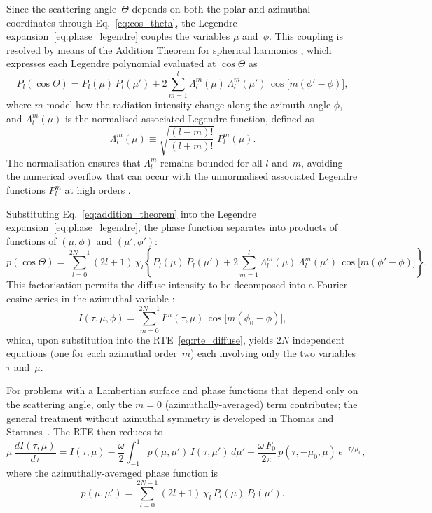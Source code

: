 \documentclass[a4paper, 11pt]{article}
\begin{document}
Since the scattering angle~$\Theta$ depends on both the polar and
azimuthal coordinates through Eq.~\eqref{eq:cos_theta}, the Legendre
expansion~\eqref{eq:phase_legendre} couples the variables $\mu$
and~$\phi$.  This coupling is resolved by means of the Addition
Theorem for spherical harmonics
\cite{chandrasekhar1950,thomas2002}, which expresses each Legendre
polynomial evaluated at $\cos\Theta$ as
%
\begin{equation}
  P_l(\cos\Theta)
  = P_l(\mu)\,P_l(\mu')
  + 2\sum_{m=1}^{l}\Lambda_l^m(\mu)\,\Lambda_l^m(\mu')\,
    \cos\bigl[m(\phi' - \phi)\bigr],
  \label{eq:addition_theorem}
\end{equation}
%
where $m$ model how the radiation intensity change along the azimuth angle $\phi$, and $\Lambda_l^m(\mu)$ is the normalised associated Legendre
function, defined as
%
\begin{equation}
  \Lambda_l^m(\mu)
  \equiv \sqrt{\frac{(l-m)!}{(l+m)!}}\;P_l^m(\mu).
  \label{eq:norm_legendre}
\end{equation}
%
The normalisation ensures that $\Lambda_l^m$ remains bounded for all
$l$ and~$m$, avoiding the numerical overflow that can occur with the
unnormalised associated Legendre functions $P_l^m$ at high orders
\cite{thomas2002}.

Substituting Eq.~\eqref{eq:addition_theorem} into the Legendre
expansion~\eqref{eq:phase_legendre}, the phase function separates
into products of functions of $(\mu,\phi)$ and $(\mu',\phi')$:
%
\begin{equation}
  p(\cos\Theta)
  = \sum_{l=0}^{2N-1}(2l+1)\,\chi_l
  \left\{P_l(\mu)\,P_l(\mu')
  + 2\sum_{m=1}^{l}\Lambda_l^m(\mu)\,\Lambda_l^m(\mu')\,
    \cos\bigl[m(\phi' - \phi)\bigr]\right\}.
  \label{eq:phase_expanded}
\end{equation}
%
This factorisation permits the diffuse intensity to be decomposed into
a Fourier cosine series in the azimuthal variable
\cite{thomas2002,disortreport}:
%
\begin{equation}
  I(\tau,\mu,\phi)
  = \sum_{m=0}^{2N-1}
    I^m(\tau,\mu)\,\cos\bigl[m(\phi_0 - \phi)\bigr],
  \label{eq:fourier_intensity}
\end{equation}
%
which, upon substitution into the RTE~\eqref{eq:rte_diffuse}, yields
$2N$ independent equations (one for each azimuthal order~$m$) each
involving only the two variables $\tau$ and~$\mu$.

For problems with a Lambertian surface and phase functions that depend
only on the scattering angle, only the $m = 0$
(azimuthally-averaged) term contributes; the general treatment
without azimuthal symmetry is developed in Thomas and
Stamnes~\cite{thomas2002}.  The RTE then reduces to
%
\begin{equation}
  \mu\,\frac{dI(\tau,\mu)}{d\tau}
  = I(\tau,\mu)
  - \frac{\omega}{2}\int_{-1}^{1} p(\mu,\mu')\,I(\tau,\mu')\,d\mu'
  - \frac{\omega\,F_0}{2\pi}\,p(\tau,-\mu_0,\mu)\,e^{-\tau/\mu_0},
  \label{eq:rte_azimuthal}
\end{equation}
%
where the azimuthally-averaged phase function is
%
\begin{equation}
  p(\mu,\mu')
  = \sum_{l=0}^{2N-1}(2l+1)\,\chi_l\,P_l(\mu)\,P_l(\mu').
  \label{eq:phase_azimuthal}
\end{equation}
\end{document}
